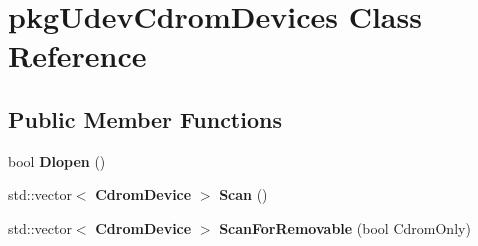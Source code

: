 \section{pkg\-Udev\-Cdrom\-Devices \-Class \-Reference}
\label{classpkgUdevCdromDevices}
\subsection*{\-Public \-Member \-Functions}
\begin{DoxyCompactItemize}
\item 
bool {\bfseries \-Dlopen} ()\label{classpkgUdevCdromDevices_a70e611741eb3b38af020883f41a183c0}

\item 
std\-::vector$<$ {\bf \-Cdrom\-Device} $>$ {\bfseries \-Scan} ()\label{classpkgUdevCdromDevices_a104f64a93476cc61efa85c838c2378e6}

\item 
std\-::vector$<$ {\bf \-Cdrom\-Device} $>$ {\bfseries \-Scan\-For\-Removable} (bool \-Cdrom\-Only)\label{classpkgUdevCdromDevices_acfcd0fc1e3531af17e08d136184fddf5}

\end{DoxyCompactItemize}
